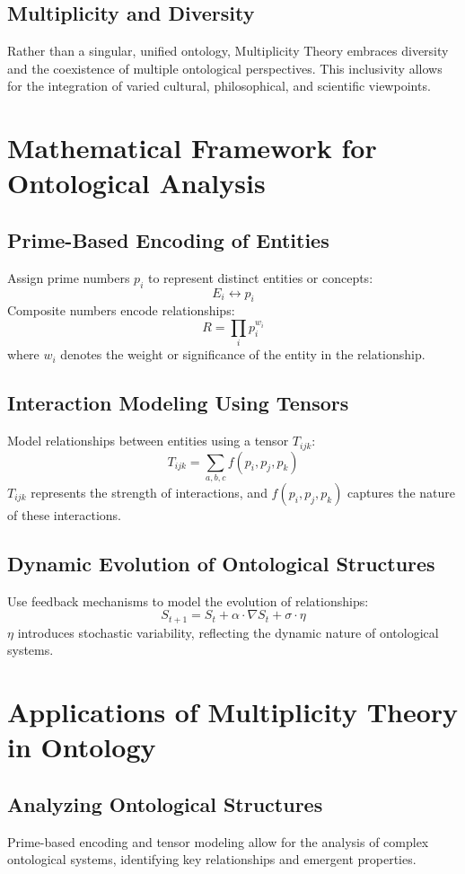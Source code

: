 \documentclass{article}
\theoremstyle{plain}
\begin{document}
\subsection{Multiplicity and Diversity}
Rather than a singular, unified ontology, Multiplicity Theory embraces diversity and the coexistence of multiple ontological perspectives. This inclusivity allows for the integration of varied cultural, philosophical, and scientific viewpoints.

\section{Mathematical Framework for Ontological Analysis}

\subsection{Prime-Based Encoding of Entities}
Assign prime numbers $p_i$ to represent distinct entities or concepts:
\[
E_i \leftrightarrow p_i
\]
Composite numbers encode relationships:
\[
R = \prod_{i} p_i^{w_i}
\]
where $w_i$ denotes the weight or significance of the entity in the relationship.

\subsection{Interaction Modeling Using Tensors}
Model relationships between entities using a tensor $T_{ijk}$:
\[
T_{ijk} = \sum_{a, b, c} f(p_i, p_j, p_k)
\]
$T_{ijk}$ represents the strength of interactions, and $f(p_i, p_j, p_k)$ captures the nature of these interactions.

\subsection{Dynamic Evolution of Ontological Structures}
Use feedback mechanisms to model the evolution of relationships:
\[
S_{t+1} = S_t + \alpha \cdot \nabla S_t + \sigma \cdot \eta
\]
$\eta$ introduces stochastic variability, reflecting the dynamic nature of ontological systems.

\section{Applications of Multiplicity Theory in Ontology}

\subsection{Analyzing Ontological Structures}
Prime-based encoding and tensor modeling allow for the analysis of complex ontological systems, identifying key relationships and emergent properties.
\end{document}
